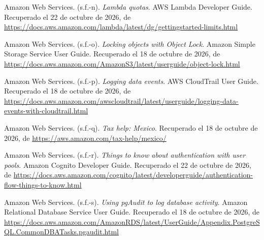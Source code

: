 \documentclass[12pt, a4paper]{article}
\begin{document}
\begin{list}{}{\setlength{\leftmargin}{1.27cm}\setlength{\itemindent}{-1.27cm}%
  \setlength{\labelwidth}{0pt}\setlength{\labelsep}{0pt}\setlength{\itemsep}{6pt}}
\item Amazon Web Services. (s.f.-n). \textit{Lambda quotas}. AWS Lambda
  Developer Guide. Recuperado el 22 de octubre de 2026, de \url{https://docs.aws.amazon.com/lambda/latest/dg/gettingstarted-limits.html}
 
 
\item Amazon Web Services. (s.f.-o). \textit{Locking objects with
  Object Lock}. Amazon Simple Storage Service User Guide. Recuperado el 18 de octubre de 2026, de \url{https://docs.aws.amazon.com/AmazonS3/latest/userguide/object-lock.html}
 
 
\item Amazon Web Services. (s.f.-p). \textit{Logging data events}.
  AWS CloudTrail User Guide. Recuperado el 18 de octubre de 2026, de \url{https://docs.aws.amazon.com/awscloudtrail/latest/userguide/logging-data-events-with-cloudtrail.html}
 
 
\item Amazon Web Services. (s.f.-q). \textit{Tax help: Mexico}. Recuperado el 18 de octubre de 2026, de \url{https://aws.amazon.com/tax-help/mexico/}
 
 
\item Amazon Web Services. (s.f.-r). \textit{Things to know about
  authentication with user pools}. Amazon Cognito Developer Guide. Recuperado el 22 de octubre de 2026, de \url{https://docs.aws.amazon.com/cognito/latest/developerguide/authentication-flow-things-to-know.html}
 
 
\item Amazon Web Services. (s.f.-s). \textit{Using pgAudit to log
  database activity}. Amazon Relational Database Service User Guide. Recuperado el 18 de octubre de 2026, de \url{https://docs.aws.amazon.com/AmazonRDS/latest/UserGuide/Appendix.PostgreSQL.CommonDBATasks.pgaudit.html}
 

\end{list}
\end{document}
